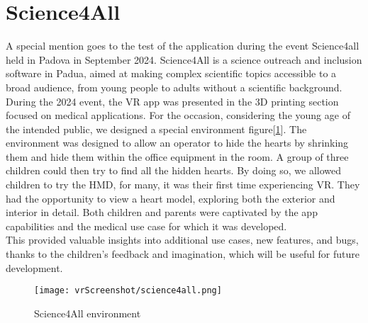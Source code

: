 \section{Science4All}
\noindent
A special mention goes to the test of the application during the event Science4all held in Padova in September 2024.
Science4All is a science outreach and inclusion software in Padua, aimed at making complex scientific topics accessible to a broad audience,
from young people to adults without a scientific background.\\
During the 2024 event, the \ac{VR} app was presented in the 3D printing section focused on medical applications.
For the occasion, considering the young age of the intended public, we designed a special environment figure[\ref{fig:science4all}].
The environment was designed to allow an operator to hide the hearts by shrinking them and hide them within the office equipment in the room. A group of three children could then try to find all the hidden hearts.
By doing so, we allowed children to try the \ac{HMD}, for many, it was their first time experiencing \ac{VR}. They had the opportunity to view a heart model, exploring both the exterior and interior in detail.
Both children and parents were captivated by the app capabilities and the medical use case for which it was developed.\\
This provided valuable insights into additional use cases, new features, and bugs, thanks to the children's feedback and imagination, which will be useful for future development.


\begin{figure}[hb]
  \centering
  \texttt{[image: vrScreenshot/science4all.png]}
  \caption{Science4All environment}
  \label{fig:science4all}
\end{figure}
